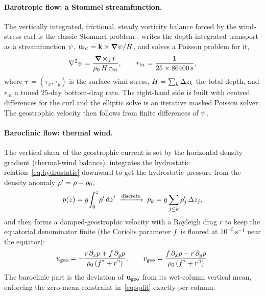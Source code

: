 \paragraph{Barotropic flow: a Stommel streamfunction.}
The vertically integrated, frictional, steady vorticity balance forced by
the wind-stress curl is the classic Stommel problem \citep{stommel1961}.
\model{} writes the depth-integrated transport as a streamfunction $\psi$,
$\mathbf{u}_{\mathrm{bt}}=\mathbf{k}\times\boldsymbol{\nabla}\psi/H$, and solves a Poisson
problem for it,
\begin{equation}
  \nabla^{2}\psi = \frac{\boldsymbol{\nabla}\!\times\!_z\boldsymbol{\tau}}
                   {\rho_0\,H\,r_{\mathrm{bt}}},
  \qquad
  r_{\mathrm{bt}} = \frac{1}{25\times86400\,\mathrm{s}},
  \label{eq:stommel}
\end{equation}
where $\boldsymbol{\tau}=(\tau_x,\tau_y)$ is the surface wind stress,
$H=\sum_k\Delta z_k$ the total depth, and $r_{\mathrm{bt}}$ a tuned
$25$-day bottom-drag rate. The right-hand side is built with centred
differences for the curl and the elliptic solve is an iterative
masked Poisson solver. The geostrophic velocity then follows from finite
differences of $\psi$.

\paragraph{Baroclinic flow: thermal wind.}
The vertical shear of the geostrophic current is set by the horizontal
density gradient (thermal-wind balance). \model{} integrates the
hydrostatic relation~\eqref{eq:hydrostatic} downward to get the hydrostatic
pressure from the density anomaly $\rho'=\rho-\rho_0$,
\begin{equation}
  p(z) = g\!\int_{0}^{z}\!\rho'\,\mathrm{d} z'
  \;\xrightarrow{\text{discrete}}\;
  p_k = g\sum_{j\le k}\rho'_j\,\Delta z_j , \label{eq:phydro}
\end{equation}
and then forms a damped-geostrophic velocity with a Rayleigh drag $r$ to
keep the equatorial denominator finite (the Coriolis parameter $f$ is
floored at $10^{-5}\,\mathrm{s^{-1}}$ near the equator):
\begin{equation}
  u_{\mathrm{geo}} = -\frac{r\,\partial_xp + f\,\partial_yp}
                            {\rho_0\,(f^2+r^2)},
  \qquad
  v_{\mathrm{geo}} = \frac{f\,\partial_xp - r\,\partial_yp}
                            {\rho_0\,(f^2+r^2)} . \label{eq:thermalwind}
\end{equation}
The baroclinic part is the deviation of $\mathbf{u}_{\mathrm{geo}}$ from its
wet-column vertical mean, enforcing the zero-mean constraint
in~\eqref{eq:split} exactly per column.

